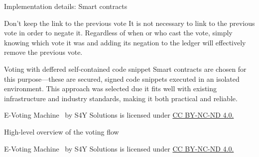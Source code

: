 \documentclass[12pt]{beamer}
\newcommand{\currentyear}{\the\year} %
\newcommand{\copyrightnote}{
    \vfill
    \begin{flushleft}
    \tiny
    E-Voting Machine \textcopyright \currentyear~by S4Y Solutions is licensed under \href{https://creativecommons.org/licenses/by-nc-nd/4.0}{CC BY-NC-ND 4.0.}
    \end{flushleft}
}
\begin{document}
    \begin{frame}[allowframebreaks]{Implementation details: Smart contracts}
        \vfill
        \begin{block}{Don't keep the link to the previous vote}
            It is not necessary to link to the previous vote in order to negate it.
            Regardless of when or who cast the vote, simply knowing which vote it was
            and adding its negation to the ledger will effectively remove the previous vote.
        \end{block}
        \begin{exampleblock}{Voting with deffered self-contained code snippet}
            Smart contracts are chosen for this purpose—these are secured, signed code snippets
            executed in an isolated environment.
            This approach was selected due it fits well with existing infrastructure and industry
            standards, making it both practical and reliable.
        \end{exampleblock}
        \copyrightnote
    \end{frame}

    \begin{frame}[allowframebreaks]{High-level overview of the voting flow}
        \vfill
        \begin{center}
        \end{center}
        \copyrightnote
    \end{frame}
\end{document}
